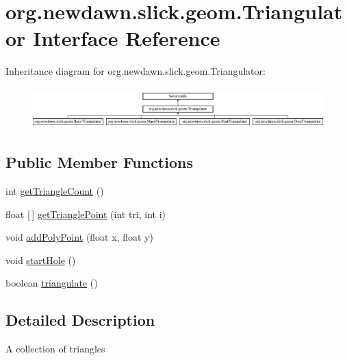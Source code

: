 \hypertarget{interfaceorg_1_1newdawn_1_1slick_1_1geom_1_1_triangulator}{}\section{org.\+newdawn.\+slick.\+geom.\+Triangulator Interface Reference}
\label{interfaceorg_1_1newdawn_1_1slick_1_1geom_1_1_triangulator}
Inheritance diagram for org.\+newdawn.\+slick.\+geom.\+Triangulator\+:\begin{figure}[H]
\begin{center}
\leavevmode
\includegraphics[height=1.596958cm]{interfaceorg_1_1newdawn_1_1slick_1_1geom_1_1_triangulator}
\end{center}
\end{figure}
\subsection*{Public Member Functions}
\begin{DoxyCompactItemize}
\item 
int \mbox{\hyperlink{interfaceorg_1_1newdawn_1_1slick_1_1geom_1_1_triangulator_a7a5d68a694f2b80878c48563b5ea6f1f}{get\+Triangle\+Count}} ()
\item 
float \mbox{[}$\,$\mbox{]} \mbox{\hyperlink{interfaceorg_1_1newdawn_1_1slick_1_1geom_1_1_triangulator_a0142ec1a5f11292813f0f4e9a1407efb}{get\+Triangle\+Point}} (int tri, int i)
\item 
void \mbox{\hyperlink{interfaceorg_1_1newdawn_1_1slick_1_1geom_1_1_triangulator_a32b11eccb582c7f4993a944df0b1db65}{add\+Poly\+Point}} (float x, float y)
\item 
void \mbox{\hyperlink{interfaceorg_1_1newdawn_1_1slick_1_1geom_1_1_triangulator_a0636d620daef98eab2ceb5bcf9dfaa9d}{start\+Hole}} ()
\item 
boolean \mbox{\hyperlink{interfaceorg_1_1newdawn_1_1slick_1_1geom_1_1_triangulator_a7c7ce8f59679b6c759a1e3d15ec4ee92}{triangulate}} ()
\end{DoxyCompactItemize}


\subsection{Detailed Description}
A collection of triangles

